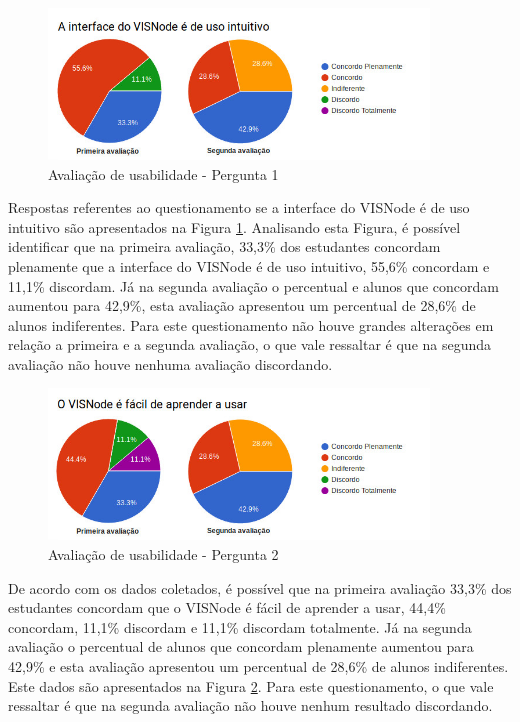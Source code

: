 \documentclass[
	12pt,				%
	oneside,			%
	a4paper,			%
	english,			%
	french,				%
	spanish,			%
	brazil,				%
	]{abntex2}
\begin{document}
\begin{figure}[H]
\centering
\caption{Avaliação de usabilidade - Pergunta 1}\label{fig:avaliacaoUsabilidade1}
\includegraphics[width=0.9\textwidth]{imagens/avaliacoes/avaliacao_usabilidade_1.jpg}
\sourceAuthor
\end{figure}

Respostas referentes ao questionamento  se a interface do VISNode é de uso intuitivo são apresentados na Figura \ref{fig:avaliacaoUsabilidade1}. Analisando esta Figura, é possível identificar que na primeira avaliação, 33,3\% dos estudantes concordam plenamente que a interface do VISNode é de uso intuitivo, 55,6\% concordam e 11,1\% discordam. Já na segunda avaliação o percentual e alunos que concordam aumentou para 42,9\%, esta avaliação apresentou um percentual de 28,6\% de alunos indiferentes. Para este questionamento não houve grandes alterações em relação a primeira e a segunda avaliação, o que vale ressaltar é que na segunda avaliação não houve nenhuma avaliação discordando.

\begin{figure}[H]
\centering
\caption{Avaliação de usabilidade - Pergunta 2}\label{fig:avaliacaoUsabilidade2}
\includegraphics[width=0.9\textwidth]{imagens/avaliacoes/avaliacao_usabilidade_2.jpg}
\sourceAuthor
\end{figure}

De acordo com os dados coletados, é possível que na primeira avaliação 33,3\% dos estudantes concordam que o VISNode é fácil de aprender a usar, 44,4\% concordam, 11,1\% discordam e 11,1\% discordam totalmente. Já na segunda avaliação o percentual de alunos que concordam plenamente aumentou para 42,9\% e esta avaliação apresentou um percentual de 28,6\% de alunos indiferentes. Este dados são apresentados na Figura \ref{fig:avaliacaoUsabilidade2}. Para este questionamento, o que vale ressaltar é que na segunda avaliação não houve nenhum resultado discordando.
\end{document}
